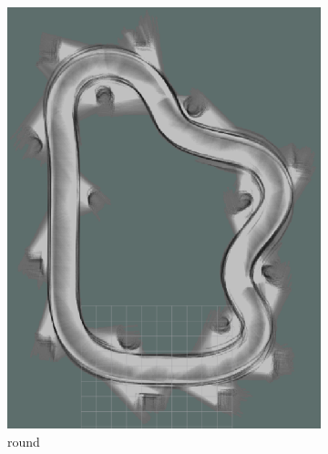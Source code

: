 \begin{figure}
\begin{subfigure}{.3\linewidth}
		\includegraphics[width=\textwidth]{Pictures/2slamtest4}
		\caption{ round}
	\end{subfigure}
	\begin{subfigure}{.3\linewidth}

\end{subfigure}
\end{figure}
